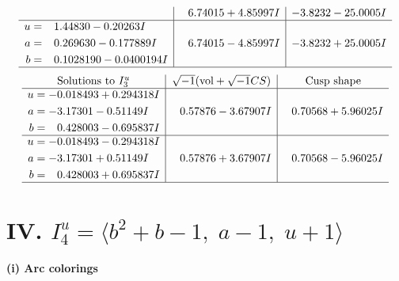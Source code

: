 \documentclass[1p]{elsarticle_modified}
\theoremstyle{definition}
\newcommand{\I}{\sqrt{-1}}
\begin{document}
$$\begin{array}{c|c|c}
 & \phantom{-}6.74015 + 4.85997 I & -3.8232 - 25.0005 I \\ \hline\begin{aligned}
u &= \phantom{-}1.44830 - 0.20263 I \\
a &= \phantom{-}0.269630 - 0.177889 I \\
b &= \phantom{-}0.1028190 - 0.0400194 I\end{aligned}
 & \phantom{-}6.74015 - 4.85997 I & -3.8232 + 25.0005 I\\
 \hline 
 \end{array}$$\newpage$$\begin{array}{c|c|c}  
\text{Solutions to }I^u_{3}& \I (\text{vol} + \sqrt{-1}CS) & \text{Cusp shape}\\
 \hline 
\begin{aligned}
u &= -0.018493 + 0.294318 I \\
a &= -3.17301 - 0.51149 I \\
b &= \phantom{-}0.428003 - 0.695837 I\end{aligned}
 & \phantom{-}0.57876 - 3.67907 I & \phantom{-}0.70568 + 5.96025 I \\ \hline\begin{aligned}
u &= -0.018493 - 0.294318 I \\
a &= -3.17301 + 0.51149 I \\
b &= \phantom{-}0.428003 + 0.695837 I\end{aligned}
 & \phantom{-}0.57876 + 3.67907 I & \phantom{-}0.70568 - 5.96025 I\\
 \hline 
 \end{array}$$\newpage\newpage\renewcommand{\arraystretch}{1}
\centering \section*{IV. $I^u_{4}= \langle b^2+b-1,\;a-1,\;u+1 \rangle$}
\flushleft \textbf{(i) Arc colorings}\\
\end{document}
